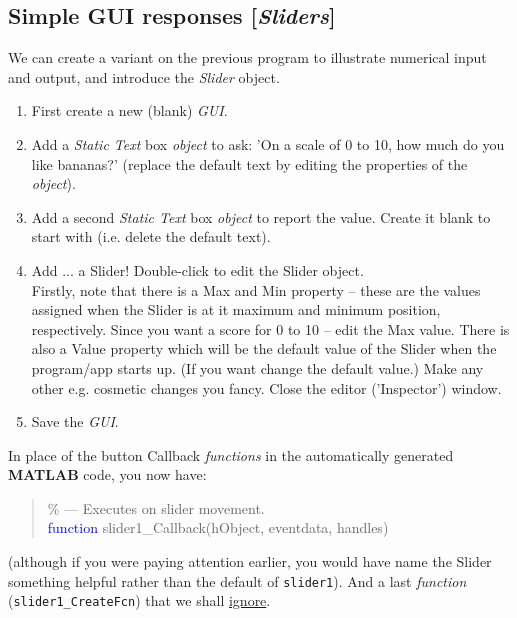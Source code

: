 \documentclass{tufte-book} %
\newenvironment{docspec}{\begin{quotation}\ttfamily\parskip0pt\parindent0pt\ignorespaces}{\end{quotation}}
\begin{document}

\subsection{Simple GUI responses [\textit{Sliders}]}

We can create a variant on the previous program to illustrate numerical input and output, and introduce the \textit{Slider} object.

\begin{enumerate}
\setlength{\itemindent}{.2in}
\item First create a new (blank) \textit{GUI}.
\item Add a \textit{Static Text} box \textit{object} to ask: 'On a scale of 0 to 10, how much do you like bananas?' (replace the default text by editing the properties of the \textit{object}).
\item Add a second \textit{Static Text} box \textit{object} to report the value. Create it blank to start with (i.e. delete the default text).
\item Add ... a \textsf{Slider}! Double-click to edit the \textsf{Slider} object.
\\Firstly, note that there is a \textsf{Max} and \textsf{Min} property -- these are the values assigned when the \textsf{Slider} is at it maximum and minimum position, respectively. Since you want a score for 0 to 10 -- edit the \textsf{Max} value. There is also a \textsf{Value} property which will be the default value of the \textsf{Slider} when the program/app starts up. (If you want change the default value.) Make any other e.g. cosmetic changes you fancy. Close the editor ('\textsf{Inspector}') window.
\item Save the \textit{GUI}.
\end{enumerate}

In place of the button Callback \textit{functions} in the automatically generated \textbf{MATLAB} code,  you now have:

\begin{docspec}
\textcolor[rgb]{0,0.501961,0}{\% --- Executes on slider movement.}
\\\textcolor{blue}{function} slider1\_Callback(hObject, eventdata, handles)
\end{docspec}
(although if you were paying attention earlier, you would have name the \textsf{Slider} something helpful rather than the default of \texttt{slider1}). And a last \textit{function} (\texttt{slider1\_CreateFcn}) that we shall \uline{ignore}.
\end{document}
